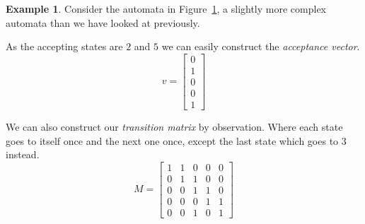 \documentclass[a4paper]{article}
\theoremstyle{definition}
\theoremstyle{definition}
\newtheorem{example}{Example}[section]
\theoremstyle{definition}
\begin{document}
\begin{example}
    Consider the automata in Figure~\ref{fig:nonTrivAuto}, a slightly more complex automata than we have looked at previously.

    \begin{figure}[H]
        \centering
        \label{fig:nonTrivAuto}
    \end{figure}

    As the accepting states are \(2\) and \(5\) we can easily construct the \emph{acceptance vector}.
    \[
    v = \begin{bmatrix}
           0 \\
           1 \\
           0 \\
           0 \\
           1
         \end{bmatrix}
    \]

    We can also construct our \emph{transition matrix} by observation. Where each state goes to itself once and the next one once, except the last state which goes to \(3\) instead.
    \[
    M = \begin{bmatrix}
           1 & 1 & 0 & 0 & 0 \\
           0 & 1 & 1 & 0 & 0 \\
           0 & 0 & 1 & 1 & 0 \\
           0 & 0 & 0 & 1 & 1 \\
           0 & 0 & 1 & 0 & 1
         \end{bmatrix}
    \]


\end{example}
\end{document}
